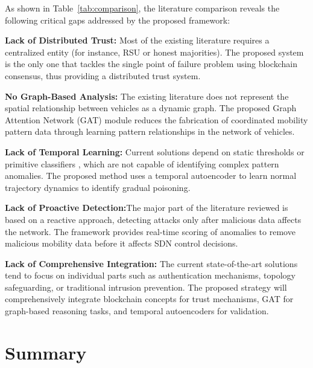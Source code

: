 \documentclass[12pt, a4paper]{report}
\begin{document}
As shown in Table~\ref{tab:comparison}, the literature comparison reveals the following critical gaps addressed by the proposed framework:

\textbf{Lack of Distributed Trust:}  Most of the existing literature requires a centralized entity (for instance, RSU or honest majorities). The proposed system is the only one that tackles the single point of failure problem using blockchain consensus, thus providing a distributed trust system.

\textbf{No Graph-Based Analysis:}
 The existing literature does not represent the spatial relationship between vehicles as a dynamic graph. The proposed Graph Attention Network (GAT) module reduces the fabrication of coordinated mobility pattern data through learning pattern relationships in the network of vehicles.

\textbf{Lack of Temporal Learning:} Current solutions depend on static thresholds \cite{ghaleb2014} or primitive classifiers \cite{raja2021}, which are not capable of identifying complex pattern anomalies. The proposed method uses a temporal autoencoder to learn normal trajectory dynamics to identify gradual poisoning.

\textbf{Lack of Proactive Detection:}The major part of the literature reviewed is based on a reactive approach, detecting attacks only after malicious data affects the network. The framework provides real-time scoring of anomalies to remove malicious mobility data before it affects SDN control decisions.

\textbf{Lack of Comprehensive Integration:} The current state-of-the-art solutions tend to focus on individual parts such as authentication mechanisms, topology safeguarding, or traditional intrusion prevention. The proposed strategy will comprehensively integrate blockchain concepts for trust mechanisms, GAT for graph-based reasoning tasks, and temporal autoencoders for validation.

\section{Summary}
\label{sec:summary}
\end{document}
